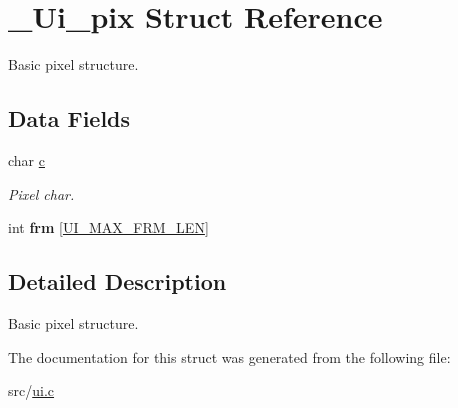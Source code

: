 \hypertarget{struct__Ui__pix}{}\section{\+\_\+\+Ui\+\_\+pix Struct Reference}
\label{struct__Ui__pix}


Basic pixel structure.  


\subsection*{Data Fields}
\begin{DoxyCompactItemize}
\item 
\mbox{\label{struct__Ui__pix_aa12b962b28524e2f295d0fd90b9595a8}} 
char \hyperlink{struct__Ui__pix_aa12b962b28524e2f295d0fd90b9595a8}{c}
\begin{DoxyCompactList}\small\item\em Pixel char. \end{DoxyCompactList}\item 
\mbox{\label{struct__Ui__pix_a55cb1d3cf8c169b53c55a6942b3cdd27}} 
int {\bfseries frm} \mbox{[}\hyperlink{ui_8c_aab208380ff579bef5fd8b91fa0c0215a}{U\+I\+\_\+\+M\+A\+X\+\_\+\+F\+R\+M\+\_\+\+L\+EN}\mbox{]}
\end{DoxyCompactItemize}


\subsection{Detailed Description}
Basic pixel structure. 

The documentation for this struct was generated from the following file\+:\begin{DoxyCompactItemize}
\item 
src/\hyperlink{ui_8c}{ui.\+c}\end{DoxyCompactItemize}
